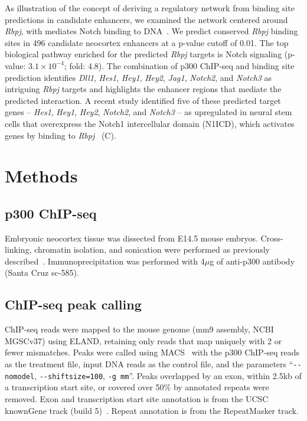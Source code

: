 As illustration of the concept of deriving a regulatory network from binding site predictions in candidate enhancers, we examined the
network centered around \textit{Rbpj}, with mediates Notch binding to DNA~\citep{Kopan2009}.  We predict conserved \textit{Rbpj} binding sites in 496
candidate neocortex enhancers at a p-value cutoff of 0.01.  The top biological pathway enriched for the predicted \textit{Rbpj} targets is Notch
signaling (p-value: $3.1\times10^{-4}$; fold: 4.8).  The combination of p300 ChIP-seq and binding site prediction
identifies \textit{Dll1}, \textit{Hes1}, \textit{Hey1}, \textit{Hey2}, \textit{Jag1}, \textit{Notch2}, and \textit{Notch3} as intriguing \textit{Rbpj} targets and highlights the enhancer regions that mediate
the predicted interaction.  A recent study identified five of these predicted target genes -- \textit{Hes1}, \textit{Hey1}, \textit{Hey2}, \textit{Notch2}, and \textit{Notch3} -- as
upregulated in neural stem cells that overexpress the Notch1 intercellular domain (N1ICD), which activates genes by binding to
\textit{Rbpj}~\citep{Li2012} (C).

\section{Methods}
\label{sec:ncxMethods}

\subsection{p300 ChIP-seq}
Embryonic neocortex tissue was dissected from E14.5 mouse embryos.  Cross-linking, chromatin isolation, and sonication were performed as
previously described~\citep{Barrera2008}.  Immunoprecipitation was performed with 4$\mu$g of anti-p300 antibody (Santa Cruz sc-585).

\subsection{ChIP-seq peak calling}
ChIP-seq reads were mapped to the mouse genome (mm9 assembly, NCBI MGSCv37) using ELAND, retaining only reads that map uniquely with 2 or
fewer mismatches.  Peaks were called using MACS~\citep{Zhang2008} with the p300 ChIP-seq reads as the treatment file, input DNA reads as
the control file, and the parameters ``\texttt{-{}-nomodel}, \texttt{-{}-shiftsize=100}, \texttt{-g mm}''.  Peaks overlapped by an exon, within 2.5kb of a transcription
start site, or covered over 50\% by annotated repeats were removed.  Exon and transcription start site annotation is from the UCSC knownGene
track (build 5)~\citep{Hsu2006}.  Repeat annotation is from the RepeatMasker track.

